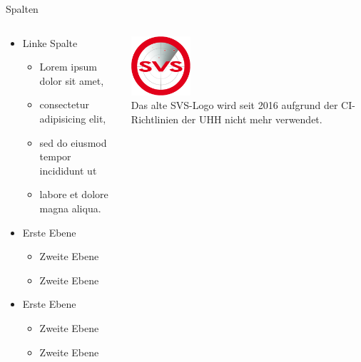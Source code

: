 \documentclass[t]{beamer}
\begin{document}
\begin{frame}{Spalten}
	\begin{columns}[T]
		\begin{column}{.6\textwidth}
			\begin{itemize}
				\item Linke Spalte
				\begin{itemize}
					\item Lorem ipsum dolor sit amet, 
					\item consectetur adipisicing elit, 
					\item sed do eiusmod tempor incididunt ut 
					\item labore et dolore magna aliqua. 
				\end{itemize}
				\item Erste Ebene
				\begin{itemize}
					\item Zweite Ebene
					\item Zweite Ebene
				\end{itemize}
				\item Erste Ebene
				\begin{itemize}
					\item Zweite Ebene
					\item Zweite Ebene
				\end{itemize}
			\end{itemize}
		\end{column}		
		\begin{column}{.4\textwidth}
			\begin{center}
				\vspace{0.5cm}
				\includegraphics[width=2.2cm]{../pic/svs_logo_uhhred.png} \\
				\small
				Das alte SVS-Logo wird seit 2016 aufgrund der CI-Richtlinien der UHH nicht mehr verwendet.
			\end{center}
		\end{column}
	\end{columns}	
\end{frame}
\end{document}
